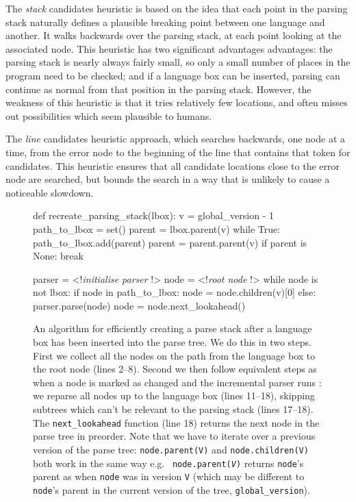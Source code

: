\documentclass[sigplan,screen]{acmart}\settopmatter{printfolios=true,printccs=false,printacmref=false}
\begin{document}
The \emph{stack} candidates heuristic is based on
the idea that each point in the parsing stack naturally defines a plausible
breaking point between one language and another. It walks backwards over the
parsing stack, at each point looking at the associated node. This heuristic has
two significant advantages
advantages: the parsing stack is nearly always fairly small, so only a small number
of places in the program need to be checked; and if a language box can be
inserted, parsing can continue as normal from that position in the parsing
stack. However, the weakness of this heuristic is that it tries relatively few
locations, and often misses out possibilities which seem plausible to humans.

The \emph{line} candidates heuristic approach, which searches
backwards, one node at a time, from the error node to the beginning of the line
that contains that token for candidates. This heuristic ensures that all
candidate locations close to the error node are searched, but bounds the search
in a way that is unlikely to cause a noticeable slowdown.

\begin{figure}
\begin{lstdefault}[]
def recreate_parsing_stack(lbox):
  v = global_version - 1
  path_to_lbox = set()
  parent = lbox.parent(v)
  while True:
    path_to_lbox.add(parent)
    parent = parent.parent(v)
    if parent is None:
      break

  parser = <!\textrm{\textit{initialise parser}} !>
  node = <!\textrm{\textit{root node}} !>
  while node is not lbox:
    if node in path_to_lbox:
      node = node.children(v)[0]
    else:
      parser.parse(node)
      node = node.next_lookahead()
\end{lstdefault}
\caption{An algorithm for efficiently creating a parse stack after a language box
has been inserted into the parse tree. We do this in two steps. First we
collect all the nodes on the path from the language box to the root node (lines
2--8). Second we then follow equivalent steps as when a node is marked as
changed and the incremental parser runs \cite[p.~63]{wagner98practicalalgorithms}:
we reparse all nodes up to the language box (lines 11--18), skipping
subtrees which can't be relevant to the parsing stack (lines 17--18). The
\texttt{next\_lookahead} function (line 18) returns the next node in the parse
tree in preorder. Note that we have to iterate over a previous version of the
parse tree: \texttt{node.parent(V)} and \texttt{node.children(V)} both work in
the same way e.g.~ \texttt{node.parent(\textit{V})} returns \texttt{node}'s
parent as when \texttt{node} was in version \texttt{V} (which may be
different to \texttt{node}'s parent in the current version of the tree,
\texttt{global\_version}).}
\label{fig:createparsestack}
\end{figure}
\end{document}

